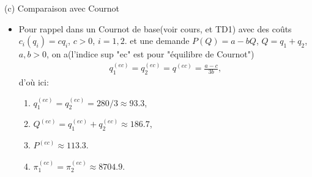 \begin{frame}[allowframebreaks]{(c) Comparaison avec Cournot}
\begin{itemize} 
\item Pour rappel dans un Cournot de base(voir cours, et TD1) avec des coûts $c_i(q_i) = cq_i$, $c>0$, $i=1, 2$. et une
demande $P(Q) = a - bQ$, $Q=q_1+q_2$, $a, b > 0$, on a(l'indice sup "ec" est pour "équilibre de Cournot")
\begin{align*}
    q_1^{(ec)} = q_2^{(ec)} = q^{(ec)} = \frac{a-c}{3b},
\end{align*}
d'où ici: 
\begin{enumerate}[-]
\item $q_1^{(ec)}=q_2^{(ec)}=280/3 \approx 93.3$, 
\item $Q^{(ec)} = q_1^{(ec)}+q_2^{(ec)} \approx 186.7$,
\item $P^{(ec)} \approx 113.3$.
\item $\pi^{(ec)}_1 = \pi^{(ec)}_2 \approx 8704.9$.
\end{enumerate}
\end{itemize}
\end{frame}


